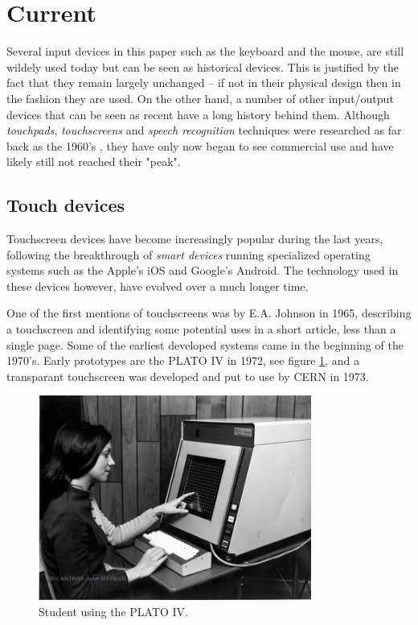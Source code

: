\section{Current}
\label{current}
Several input devices in this paper such as the keyboard and the mouse, are still wildely used today but can be seen as historical devices. This is justified by the fact that they remain largely unchanged -- if not in their physical design then in the fashion they are used. On the other hand, a number of other input/output devices that can be seen as recent have a long history behind them. Although \emph{touchpads}, \emph{touchscreens} and \emph{speech recognition} techniques were researched as far back as the 1960's \cite{buxton}\cite{shoebox}, they have only now began to see commercial use and have likely still not reached their "peak". 


\subsection{Touch devices}
Touchscreen devices have become increasingly popular during the last years, following the breakthrough of \emph{smart devices} running specialized operating systems such as the Apple's iOS and Google's Android. The technology used in these devices however, have evolved over a much longer time.

One of the first mentions of touchscreens was by E.A. Johnson in 1965, describing a touchscreen and identifying some potential uses in a short article, less than a single page\cite{4205802}. Some of the earliest developed systems came in the beginning of the 1970's. Early prototypes are the PLATO IV\cite{buxton} in 1972, see figure \ref{platoIV}, and a transparant touchscreen was developed and put to use by CERN in 1973\cite{cern}.

\begin{figure}[]
\includegraphics[width=0.8\textwidth] {bilder/platoiv.jpg}
\caption{Student using the PLATO IV.}
\label{platoIV}
\end{figure}
\nocite{platoiv}

